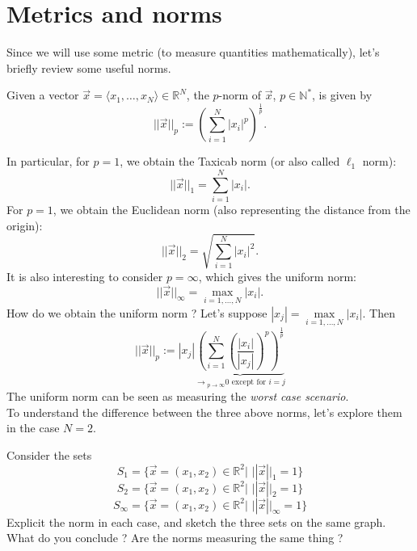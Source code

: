 \section{Metrics and norms}

Since we will use some metric (to measure quantities mathematically), let's briefly review some useful norms.

\begin{definition}
Given a vector $\vec{x} = \langle x_1, \dots, x_N\rangle \in \mathbb{R}^N$, the $p$-norm of $\vec{x}$, $p\in \mathbb{N}^\ast$, is given by
\[ || \vec{x} ||_p := \left( \sum \limits_{i = 1}^N |x_i|^p\right)^{\frac{1}{p}}.\]
\end{definition}
In particular, for $p=1$, we obtain the Taxicab norm (or also called $\ell_1$ norm):
\[ || \vec{x} ||_1 = \sum \limits_{i = 1}^N |x_i|.
\]
For $p=1$, we obtain the Euclidean norm (also representing the distance from the origin):
\[ || \vec{x} ||_2 = \sqrt{ \sum \limits_{i = 1}^N |x_i|^2 }.
\]
It is also interesting to consider $p = \infty$, which gives the uniform norm:
\[  || \vec{x} ||_\infty = \max \limits_{i = 1, \dots, N} |x_i|. 
\]
How do we obtain the uniform norm ? Let's suppose $|x_j| = \max \limits_{i = 1, \dots, N} |x_i|$. Then
\[ || \vec{x} ||_p :=  |x_j| \underset{\to {}_{p \to \infty} 0 \text{ except for } i = j}{\underbrace{\left(  \sum \limits_{i = 1}^N \left(\frac{|x_i|}{|x_j|} \right) ^p \right)^{\frac{1}{p}}}} \]
The uniform norm can be seen as measuring the \textit{worst case scenario}.\\

To understand the difference between the three above norms, let's explore them in the case $N = 2$. 

\begin{Exercise}
Consider the sets
\[S_1 = \lbrace \vec{x} = (x_1,x_2) \in \mathbb{R}^2 |\,\,  || \vec{x} ||_1 = 1\rbrace\]
\[S_2 = \lbrace \vec{x} = (x_1,x_2) \in \mathbb{R}^2 | \, \,  || \vec{x} ||_2 = 1\rbrace\]
\[S_\infty = \lbrace \vec{x} = (x_1,x_2) \in \mathbb{R}^2 | \, \,|| \vec{x} ||_\infty = 1\rbrace\]
Explicit the norm in each case, and sketch the three sets on the same graph. What do you conclude ? Are the norms measuring the same thing ?  


\dotfill

\dotfill

\dotfill

\dotfill

\dotfill

\dotfill

\dotfill

\dotfill

\dotfill

\dotfill
\end{Exercise}


